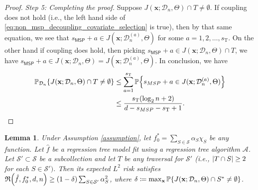 \documentclass[11pt]{article}
\newtheorem{lemma}[theorem]{Lemma}
\newcommand{\bx}{\mathbf{x}}
\DeclarePairedDelimiter{\braces}{\lbrace}{\rbrace}
\DeclarePairedDelimiter{\paren}{(}{)}
\DeclarePairedDelimiter{\abs}{|}{|}
\renewcommand{\P}{\mathbb{P}}
\newcommand{\Var}{\operatorname{Var}}
\newcommand{\sparsity}{s}
\newcommand{\nfeats}{d}
\newcommand{\nsamples}{n}
\newcommand{\data}[1][n]{\mathcal{D}_{#1}}
\newcommand{\MSP}{\textsf{MSP}}
\newcommand{\suppset}{S^*}
\newcommand{\monomial}{\chi}
\newcommand{\traversal}{T}
\newcommand{\fcoefs}{\mathcal{S}}
\newcommand{\alg}{\mathcal{A}}
\newcommand{\objective}{\mathfrak{R}}
\newcommand{\traversalsize}{\sparsity_{\operatorname{T}}}
\begin{document}
\begin{proof}
    \textit{Step 5: Completing the proof.}
    Suppose $J(\bx;\data,\Theta)\cap \traversal \neq \emptyset$.
    If coupling does not hold (i.e., the left hand side of \eqref{eq:non_msp_decoupling_covariate_selection} is true), then by that same equation, we see that $\sparsity_{\MSP} + a \in J(\bx;\data^{(a)},\Theta)$ for some $a=1,2,\ldots,\traversalsize$.
    On the other hand if coupling does hold, then picking $\sparsity_{\MSP} + a \in J(\bx;\data,\Theta)\cap \traversal$, we have $\sparsity_{\MSP} + a \in J(\bx;\data,\Theta) = J(\bx;\data^{(a)},\Theta)$.
    In conclusion, we have
    \begin{equation}
    \begin{split}
        \P_{\data}\braces*{J(\bx;\data,\Theta)\cap \traversal \neq \emptyset } & \leq \sum_{a=1}^{\traversalsize} \P\braces*{\sparsity_{\MSP} + a \in J(\bx;\data^{(a)},\Theta)} \\
        & \leq \frac{\traversalsize(\log_2 \nsamples + 2)}{\nfeats - \sparsity_{\MSP}-\traversalsize+1}. \qedhere
    \end{split}
    \end{equation}
\end{proof}

\begin{lemma}
\label{lem:covariate_selection_tree_v2}
    Under Assumption \ref{assumption}, let $f_0^*=\sum_{S \in \fcoefs} \alpha_S\monomial_S$ be any function. 
    Let $\hat f$ be a regression tree model fit using a regression tree algorithm $\alg$.
    Let $\fcoefs' \subset \fcoefs$ be a subcollection and let $\traversal$ be any traversal for $\fcoefs'$ (i.e., $\abs{T\cap S} \geq 2$ for each $S \in \fcoefs')$.
    Then its expected $L^2$ risk satisfies $\objective\paren*{\hat f, f^*_0,\nfeats,\nsamples} \geq (1-\delta)\sum_{S \in \fcoefs'} \alpha_S^2$, where $\delta \coloneqq \max_{\bx}\P\braces*{J(\bx;\data,\Theta)\cap \suppset \neq \emptyset }$.
\end{lemma}
\end{document}
